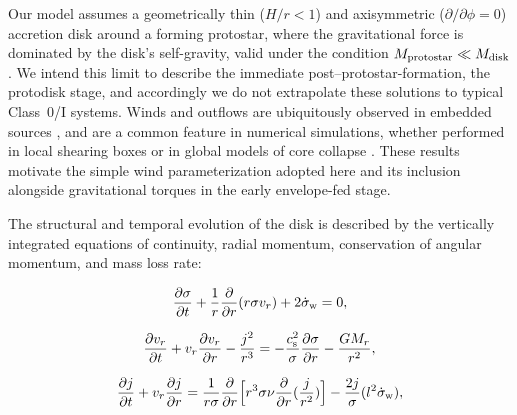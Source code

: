 \documentclass[twocolumn,linenumbers]{aastex631}
\begin{document}
Our model assumes a geometrically thin ($H/r < 1$) and axisymmetric ($\partial / \partial \phi = 0$) accretion disk around a forming protostar, where the gravitational force is dominated by the disk's self-gravity, valid under the condition $M_{\rm protostar} \ll M_{\rm disk}$. We intend this limit to describe the immediate post–protostar-formation, the protodisk stage, and accordingly we do not extrapolate these solutions to typical Class~0/I systems.
Winds and outflows are ubiquitously observed in embedded sources \citep{pudritz2019outflows,gaudel2020angmom}, and are a common feature in numerical simulations, whether performed in local shearing boxes \citep{fromang2013local} or in global models of core collapse \citep{machida2019first, machida2024wind}.
These results motivate the simple wind parameterization adopted here and its inclusion alongside gravitational torques in the early envelope-fed stage.

The structural and temporal evolution of the disk is described by the vertically integrated equations of continuity, radial momentum, conservation of angular momentum, and mass loss rate:

\begin{equation}
\frac{\partial \sigma}{\partial t}
+\frac{1}{r}\frac{\partial}{\partial r}(r\sigma v_{r})
+2\dot{\sigma}_{\rm w}=0,
\label{eq1}
\end{equation}

\begin{equation}
\frac{\partial v_{r}}{\partial t}+v_{r} \frac{\partial v_{r}}{\partial r}
-\frac{j^2}{r^3}=-\frac{c_{\rm s}^2}{\sigma}\frac{\partial \sigma}{\partial r}
-\frac{GM_{r}}{r^2},
\label{eq2}
\end{equation}

\begin{equation}
\frac{\partial j}{\partial t}
+v_{r}\frac{\partial j}{\partial r}
=\frac{1}{r\sigma}\frac{\partial}{\partial r} \Big[r^3\sigma\nu\frac{\partial}{\partial r}(\frac{j}{r^2})\Big]
-\frac{2j}{\sigma}(l^2 \dot{\sigma}_{\rm w}),
\label{eq3}
\end{equation}
\end{document}
